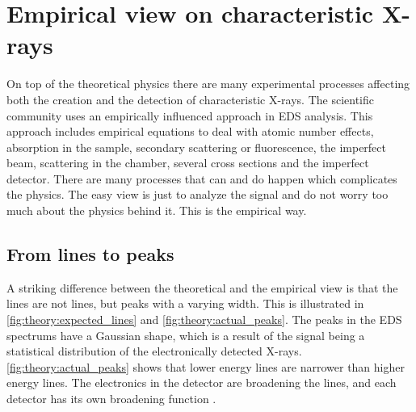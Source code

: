 

\clearpage











\section{Empirical view on characteristic X-rays}
\label{sec:theory:empirical}
On top of the theoretical physics there are many experimental processes affecting both the creation and the detection of characteristic X-rays.
The scientific community uses an empirically influenced approach in EDS analysis.
This approach includes empirical equations to deal with atomic number effects, absorption in the sample, secondary scattering or fluorescence, the imperfect beam, scattering in the chamber, several cross sections and the imperfect detector.
There are many processes that can and do happen which complicates the physics.
The easy view is just to analyze the signal and do not worry too much about the physics behind it.
This is the empirical way.


%
%
\subsection{From lines to peaks}
\label{sec:theory:empirical:peaks}
A striking difference between the theoretical and the empirical view is that the lines are not lines, but peaks with a varying width.
This is illustrated in \cref{fig:theory:expected_lines} and \cref{fig:theory:actual_peaks}.
The peaks in the EDS spectrums have a Gaussian shape, which is a result of the signal being a statistical distribution of the electronically detected X-rays.
\cref{fig:theory:actual_peaks} shows that lower energy lines are narrower than higher energy lines.
The electronics in the detector are broadening the lines, and each detector has its own broadening function \cite{broadening_broduscha}.

